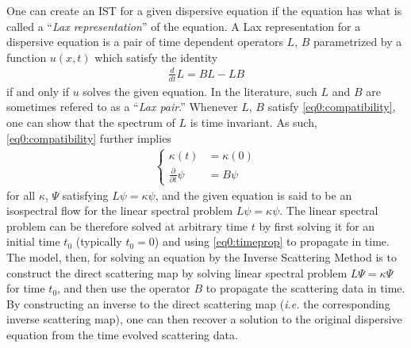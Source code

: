 \documentclass[../dissertation.tex]{subfiles}
\begin{document}
One can create an IST for a given dispersive equation if the equation
has what is called a ``\textit{Lax representation}'' of the equation. A Lax 
representation for a dispersive equation is 
a pair of time dependent operators $L$, $B$ parametrized by a 
function $u(x,t)$ which satisfy the identity
\begin{align}\label{eq0:compatibility}
    \frac{d}{dt} L = BL - LB
\end{align}
if and only if $u$ solves the given equation. In the literature, such $L$ and $B$ 
are sometimes refered to as a ``\textit{Lax pair}.''
Whenever $L$, $B$ satisfy 
\eqref{eq0:compatibility}, one can show that the spectrum of $L$ is time invariant.
As such, \eqref{eq0:compatibility} further implies
\begin{align}\label{eq0:timeprop}
    \left\{
        \begin{aligned}
             \kappa(t) &= \kappa(0) \\
             \frac{\partial}{\partial t}\psi &= B \psi
        \end{aligned}
    \right.
\end{align}
for all $\kappa$, $\Psi$ satisfying $L\psi = \kappa \psi$, and the given 
equation is said to be an isospectral flow for the linear spectral problem
$L\psi = \kappa \psi$. The linear spectral 
problem can be therefore solved at arbitrary time $t$ by first solving it 
for an initial time $t_0$ (typically $t_0 = 0$) and using \eqref{eq0:timeprop}
to propagate in time. The model, then, for solving an equation by the Inverse
Scattering Method is to construct the direct scattering map by solving linear
spectral problem $L\Psi = \kappa \Psi$ for time $t_0$, and then use the operator
$B$ to propagate the scattering data in time. By constructing an inverse 
to the direct scattering map (\textit{i.e.} the corresponding inverse scattering
map), one can then recover a solution to the original dispersive equation 
from the time evolved scattering data.
\end{document}
